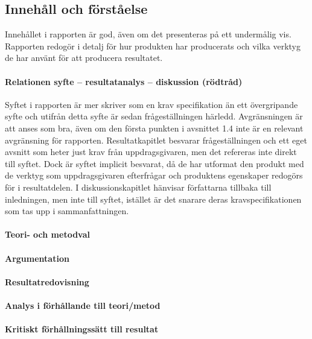     \subsection{Innehåll och förståelse} %
    \label{sub:innehall}
    Innehållet i rapporten är god, även om det presenteras på ett undermålig vis. Rapporten redogör i detalj för hur produkten har producerats och vilka verktyg de har använt för att producera resultatet.

    \paragraph{Relationen syfte – resultatanalys – diskussion (rödtråd)}
        Syftet i rapporten är mer skriver som en krav specifikation än ett övergripande syfte och utifrån detta syfte är sedan frågeställningen härledd. Avgränsningen är att anses som bra, även om den första punkten i avsnittet 1.4 inte är en relevant avgränsning för rapporten. Resultatkapitlet besvarar frågeställningen och ett eget avsnitt som heter just krav från uppdragsgivaren, men det refereras inte direkt till syftet. Dock är syftet implicit besvarat, då de har utformat den produkt med de verktyg som uppdragsgivaren efterfrågar och produktens egenskaper redogörs för i resultatdelen. I diskussionskapitlet hänvisar författarna tillbaka till inledningen, men inte till syftet, istället är det snarare deras kravspecifikationen som tas upp i sammanfattningen.

    \paragraph{Teori- och metodval}

    \paragraph{Argumentation}

    \paragraph{Resultatredovisning}

    \paragraph{Analys i förhållande till teori/metod  }

    \paragraph{Kritiskt förhållningssätt till resultat}

